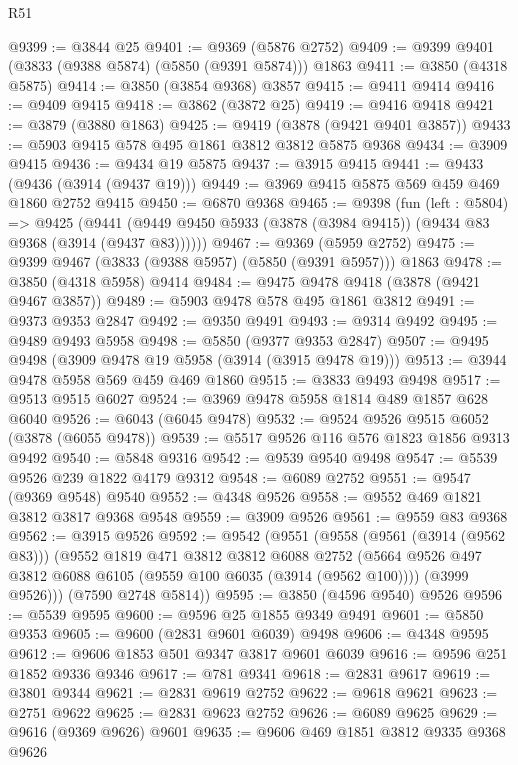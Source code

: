 \begin{lexlean}{R51}
\begin{coremodule}
@9399 := @3844 @25
@9401 := @9369 (@5876 @2752)
@9409 := @9399 @9401 (@3833 (@9388 @5874) (@5850 (@9391 @5874))) @1863
@9411 := @3850 (@4318 @5875)
@9414 := @3850 (@3854 @9368) @3857
@9415 := @9411 @9414
@9416 := @9409 @9415
@9418 := @3862 (@3872 @25)
@9419 := @9416 @9418
@9421 := @3879 (@3880 @1863)
@9425 := @9419 (@3878 (@9421 @9401 @3857))
@9433 := @5903 @9415 @578 @495 @1861 @3812 @3812 @5875 @9368
@9434 := @3909 @9415
@9436 := @9434 @19 @5875
@9437 := @3915 @9415
@9441 := @9433 (@9436 (@3914 (@9437 @19)))
@9449 := @3969 @9415 @5875 @569 @459 @469 @1860 @2752 @9415
@9450 := @6870 @9368
@9465 := @9398
    (fun (left : @5804) =>
    @9425 (@9441 (@9449 @9450 @5933 (@3878 (@3984 @9415)) (@9434 @83 @9368 (@3914 (@9437 @83))))))
@9467 := @9369 (@5959 @2752)
@9475 := @9399 @9467 (@3833 (@9388 @5957) (@5850 (@9391 @5957))) @1863
@9478 := @3850 (@4318 @5958) @9414
@9484 := @9475 @9478 @9418 (@3878 (@9421 @9467 @3857))
@9489 := @5903 @9478 @578 @495 @1861 @3812
@9491 := @9373 @9353 @2847
@9492 := @9350 @9491
@9493 := @9314 @9492
@9495 := @9489 @9493 @5958
@9498 := @5850 (@9377 @9353 @2847)
@9507 := @9495 @9498 (@3909 @9478 @19 @5958 (@3914 (@3915 @9478 @19)))
@9513 := @3944 @9478 @5958 @569 @459 @469 @1860
@9515 := @3833 @9493 @9498
@9517 := @9513 @9515 @6027
@9524 := @3969 @9478 @5958 @1814 @489 @1857 @628 @6040
@9526 := @6043 (@6045 @9478)
@9532 := @9524 @9526 @9515 @6052 (@3878 (@6055 @9478))
@9539 := @5517 @9526 @116 @576 @1823 @1856 @9313 @9492
@9540 := @5848 @9316
@9542 := @9539 @9540 @9498
@9547 := @5539 @9526 @239 @1822 @4179 @9312
@9548 := @6089 @2752
@9551 := @9547 (@9369 @9548) @9540
@9552 := @4348 @9526
@9558 := @9552 @469 @1821 @3812 @3817 @9368 @9548
@9559 := @3909 @9526
@9561 := @9559 @83 @9368
@9562 := @3915 @9526
@9592 := @9542
    (@9551
      (@9558
        (@9561 (@3914 (@9562 @83)))
        (@9552
          @1819
          @471
          @3812
          @3812
          @6088
          @2752
          (@5664 @9526 @497 @3812 @6088 @6105 (@9559 @100 @6035 (@3914 (@9562 @100))))
          (@3999 @9526)))
      (@7590 @2748 @5814))
@9595 := @3850 (@4596 @9540) @9526
@9596 := @5539 @9595
@9600 := @9596 @25 @1855 @9349 @9491
@9601 := @5850 @9353
@9605 := @9600 (@2831 @9601 @6039) @9498
@9606 := @4348 @9595
@9612 := @9606 @1853 @501 @9347 @3817 @9601 @6039
@9616 := @9596 @251 @1852 @9336 @9346
@9617 := @781 @9341
@9618 := @2831 @9617
@9619 := @3801 @9344
@9621 := @2831 @9619 @2752
@9622 := @9618 @9621
@9623 := @2751 @9622
@9625 := @2831 @9623 @2752
@9626 := @6089 @9625
@9629 := @9616 (@9369 @9626) @9601
@9635 := @9606 @469 @1851 @3812 @9335 @9368 @9626

\end{coremodule}
\end{lexlean}
